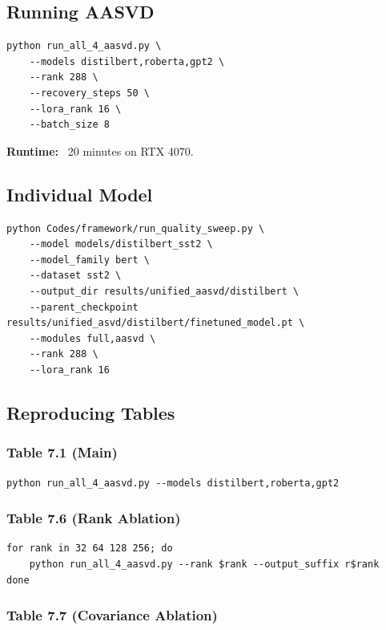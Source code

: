 \subsection{Running AASVD}

\begin{lstlisting}
python run_all_4_aasvd.py \
    --models distilbert,roberta,gpt2 \
    --rank 288 \
    --recovery_steps 50 \
    --lora_rank 16 \
    --batch_size 8
\end{lstlisting}

\textbf{Runtime:} ~20 minutes on RTX 4070.

\subsection{Individual Model}

\begin{lstlisting}
python Codes/framework/run_quality_sweep.py \
    --model models/distilbert_sst2 \
    --model_family bert \
    --dataset sst2 \
    --output_dir results/unified_aasvd/distilbert \
    --parent_checkpoint results/unified_asvd/distilbert/finetuned_model.pt \
    --modules full,aasvd \
    --rank 288 \
    --lora_rank 16
\end{lstlisting}

\subsection{Reproducing Tables}

\subsubsection{Table 7.1 (Main)}

\begin{lstlisting}
python run_all_4_aasvd.py --models distilbert,roberta,gpt2
\end{lstlisting}

\subsubsection{Table 7.6 (Rank Ablation)}

\begin{lstlisting}
for rank in 32 64 128 256; do
    python run_all_4_aasvd.py --rank $rank --output_suffix r$rank
done
\end{lstlisting}

\subsubsection{Table 7.7 (Covariance Ablation)}

